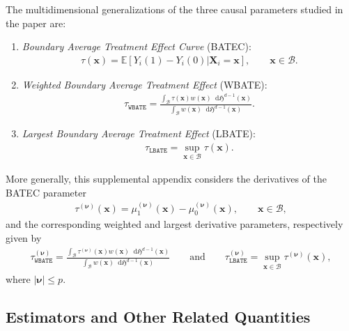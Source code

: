 \documentclass[10pt]{article}
\newcommand{\E}{\mathbb{E}}
\newcommand{\Haus}{\mathfrak{H}}
\newcommand{\dif}{\mathop{}\!\mathrm{d}}
\newcommand{\bx}{\mathbf{x}}
\newcommand{\bX}{\mathbf{X}}
\newcommand{\bnu}{\boldsymbol{\nu}}
\newcommand{\B}{\mathcal{B}}
\begin{document}
The multidimensional generalizations of the three causal parameters studied in the paper are:
\begin{enumerate}
    \item \emph{Boundary Average Treatment Effect Curve} (BATEC):
    \begin{align*}
        \tau(\bx) = \E[Y_i(1) - Y_i(0)|\bX_i = \bx], \qquad \bx\in\B.
    \end{align*}

    \item \emph{Weighted Boundary Average Treatment Effect} (WBATE):
    \begin{align*}
        \tau_{\mathtt{WBATE}} = \frac{\int_{\B} \tau(\bx) w(\bx) \dif\Haus^{d-1}(\bx)}
                                     {\int_{\B} w(\bx) \dif\Haus^{d-1}(\bx)}.
    \end{align*}

    \item \emph{Largest Boundary Average Treatment Effect} (LBATE):
    \begin{align*}
        \tau_{\mathtt{LBATE}} = \sup_{\bx\in\B} \tau(\bx).
    \end{align*}

\end{enumerate}
More generally, this supplemental appendix considers the derivatives of the BATEC parameter
\begin{align*}
    \tau^{(\bnu)}(\bx) = \mu^{(\bnu)}_1(\bx) - \mu^{(\bnu)}_0(\bx), \qquad \bx \in \B,
\end{align*}
and the corresponding weighted and largest derivative parameters, respectively given by
\begin{align*}
    \tau_{\mathtt{WBATE}}^{(\bnu)} = \frac{\int_{\B} \tau^{(\bnu)}(\bx) w(\bx) \dif\Haus^{d-1}(\bx)}
                                     {\int_{\B} w(\bx) \dif\Haus^{d-1}(\bx)}
    \qquad\text{and}\qquad
    \tau_{\mathtt{LBATE}}^{(\bnu)} = \sup_{\bx\in\B} \tau^{(\bnu)}(\bx),
\end{align*}
where $|\bnu| \leq p$.

\subsection{Estimators and Other Related Quantities}
\end{document}
